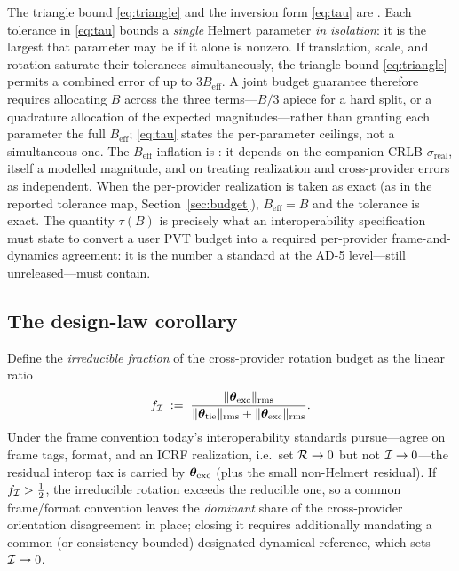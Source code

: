\noindent The triangle bound \eqref{eq:triangle} and the inversion form
\eqref{eq:tau} are \Proven{}. Each tolerance in \eqref{eq:tau} bounds a \emph{single}
Helmert parameter \emph{in isolation}: it is the largest that parameter may be if it
alone is nonzero. If translation, scale, and rotation saturate their tolerances
simultaneously, the triangle bound \eqref{eq:triangle} permits a combined error of up
to $3B_{\mathrm{eff}}$. A joint budget guarantee therefore requires allocating $B$
across the three terms---$B/3$ apiece for a hard split, or a quadrature allocation of
the expected magnitudes---rather than granting each parameter the full
$B_{\mathrm{eff}}$; \eqref{eq:tau} states the per-parameter ceilings, not a
simultaneous one. The $B_{\mathrm{eff}}$ inflation is \Modelled{}: it
depends on the companion CRLB $\sigma_{\mathrm{real}}$, itself a modelled magnitude,
and on treating realization and cross-provider errors as independent. When the
per-provider realization is taken as exact (as in the reported tolerance map,
Section~\ref{sec:budget}), $B_{\mathrm{eff}}=B$ and the tolerance is exact. The
quantity $\tau(B)$ is precisely what an interoperability specification must state to
convert a user PVT budget into a required per-provider frame-and-dynamics agreement:
it is the number a standard at the AD-5 level---still unreleased---must contain.

\subsection{The design-law corollary}

\begin{corollary}
\label{cor:designlaw}
Define the \emph{irreducible fraction} of the cross-provider rotation budget as the
linear ratio
\begin{equation}
  f_{\mathcal{I}} \;:=\;
  \frac{\|\bm{\theta}_{\mathrm{exc}}\|_{\mathrm{rms}}}
       {\|\bm{\theta}_{\mathrm{tie}}\|_{\mathrm{rms}}+\|\bm{\theta}_{\mathrm{exc}}\|_{\mathrm{rms}}} .
  \label{eq:irrfrac}
\end{equation}
Under the frame convention today's interoperability standards pursue---agree on frame
tags, format, and an ICRF realization, i.e.\ set $\mathcal{R}\to0$ but not $\mathcal{I}\to0$---the
residual interop tax is carried by $\bm{\theta}_{\mathrm{exc}}$ (plus the small non-Helmert
residual). If $f_{\mathcal{I}}>\tfrac12$, the irreducible rotation exceeds the reducible one,
so a common frame/format convention leaves the \emph{dominant} share of the
cross-provider orientation disagreement in place; closing it requires additionally
mandating a common (or consistency-bounded) designated dynamical reference, which sets
$\mathcal{I}\to0$.
\end{corollary}

